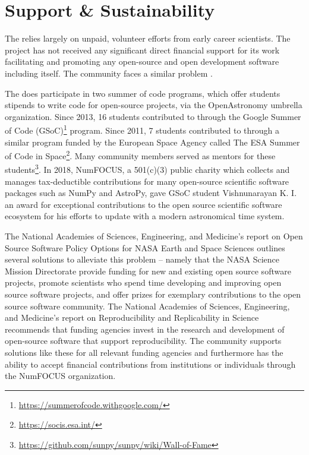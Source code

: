 \section{Support \& Sustainability}

The \sunpyproj relies largely on unpaid, volunteer efforts from early career scientists.
The project has not received any significant direct financial support for its work facilitating and promoting any open-source and open development software including \sunpy itself.
The \astropy community faces a similar problem \citep{PriceWhelan:2018ji, Muna2016}.

The \sunpyproj does participate in two summer of code programs, which offer students stipends to write code for open-source projects, via the OpenAstronomy umbrella organization.
Since 2013, 16 students contributed to \sunpy through the Google Summer of Code (GSoC)\footnote{\url{https://summerofcode.withgoogle.com/}} program.
Since 2011, 7 students contributed to \sunpy through a similar program funded by the European Space Agency called The ESA Summer of Code in Space\footnote{\url{https://socis.esa.int/}}.
Many \sunpy community members served as mentors for these students\footnote{\url{https://github.com/sunpy/sunpy/wiki/Wall-of-Fame}}.
In 2018, NumFOCUS, a 501(c)(3) public charity which collects and manages tax-deductible contributions for many open-source scientific software packages such as NumPy and AstroPy, gave GSoC student Vishnunarayan K. I. an award for exceptional contributions to the open source scientific software ecosystem for his efforts to update \sunpy with a modern astronomical time system.

The National Academies of Sciences, Engineering, and Medicine's report on Open Source Software Policy Options for NASA Earth and Space Sciences \citep{NAP2018} outlines several solutions to alleviate this problem -- namely that the NASA Science Mission Directorate provide funding for new and existing open source software projects, promote scientists who spend time developing and improving open source software projects, and offer prizes for exemplary contributions to the open source software community.
The National Academies of Sciences, Engineering, and Medicine's report on Reproducibility and Replicability in Science \citep{NAP2019} recommends that funding agencies invest in the research and development of open-source software that support reproducibility.
The \sunpy community supports solutions like these for all relevant funding agencies and furthermore has the ability to accept financial contributions from institutions or individuals through the NumFOCUS organization.


